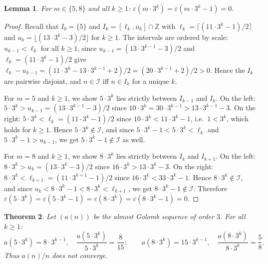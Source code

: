 \documentclass[12pt]{article}
\newtheorem{theorem}{Theorem}[section]
\newtheorem{lemma}[theorem]{Lemma}
\theoremstyle{definition}
\theoremstyle{remark}
\begin{document}
\begin{lemma}\label{lem:gaps}
  For $m\in\{5,8\}$ and all $k\ge 1$:\; $\varepsilon(m\cdot 3^k)=\varepsilon(m\cdot 3^k-1)=0$.
\end{lemma}

\begin{proof}
  Recall that $I_0=\{5\}$ and $I_k=[\ell_k,u_k]\cap\mathbb{Z}$ with
  $\ell_k=\lceil(11\cdot 3^k-1)/2\rceil$ and $u_k=\lfloor(13\cdot 3^k-3)/2\rfloor$
  for $k\ge 1$.
  The intervals are ordered by scale: $u_{k-1}<\ell_k$ for all $k\ge 1$, since
  $u_{k-1}=(13\cdot 3^{k-1}-3)/2$ and $\ell_k=(11\cdot 3^k-1)/2$ give
  $\ell_k - u_{k-1} = (11\cdot 3^k - 13\cdot 3^{k-1} + 2)/2 = (20\cdot 3^{k-1}+2)/2 > 0$.
  Hence the $I_k$ are pairwise disjoint, and $n\in\mathcal{I}$
  iff $n\in I_k$ for a unique $k$.

  For $m=5$ and $k\ge 1$, we show $5\cdot 3^k$ lies strictly between $I_{k-1}$ and $I_k$.
  On the left: $5\cdot 3^k > u_{k-1} = (13\cdot 3^{k-1}-3)/2$
  since $10\cdot 3^k = 30\cdot 3^{k-1} > 13\cdot 3^{k-1} - 3$.
  On the right: $5\cdot 3^k < \ell_k = (11\cdot 3^k-1)/2$
  since $10\cdot 3^k < 11\cdot 3^k - 1$, i.e.\ $1 < 3^k$, which holds for $k\ge 1$.
  Hence $5\cdot 3^k\notin\mathcal{I}$, and since $5\cdot 3^k - 1 < 5\cdot 3^k < \ell_k$
  and $5\cdot 3^k - 1 > u_{k-1}$, we get $5\cdot 3^k - 1\notin\mathcal{I}$ as well.

  For $m=8$ and $k\ge 1$, we show $8\cdot 3^k$ lies strictly between $I_k$ and $I_{k+1}$.
  On the left: $8\cdot 3^k > u_k = (13\cdot 3^k-3)/2$
  since $16\cdot 3^k > 13\cdot 3^k - 3$.
  On the right: $8\cdot 3^k < \ell_{k+1} = (11\cdot 3^{k+1}-1)/2$
  since $16\cdot 3^k < 33\cdot 3^k - 1$.
  Hence $8\cdot 3^k\notin\mathcal{I}$, and since $u_k < 8\cdot 3^k - 1 < 8\cdot 3^k < \ell_{k+1}$,
  we get $8\cdot 3^k - 1\notin\mathcal{I}$.
  Therefore $\varepsilon(5\cdot 3^k)=\varepsilon(5\cdot 3^k-1)
  =\varepsilon(8\cdot 3^k)=\varepsilon(8\cdot 3^k-1)=0$.
\end{proof}

\begin{theorem}\label{thm:ratio3}
  Let $(a(n))$ be the almost Golomb sequence of order $3$.
  For all $k\ge 1$:
  \[
    a(5\cdot 3^k) = 8\cdot 3^{k-1}, \quad
    \frac{a(5\cdot 3^k)}{5\cdot 3^k} = \frac{8}{15};
    \qquad
    a(8\cdot 3^k) = 15\cdot 3^{k-1}, \quad
    \frac{a(8\cdot 3^k)}{8\cdot 3^k} = \frac{5}{8}.
  \]
  Thus $a(n)/n$ does not converge.
\end{theorem}
\end{document}
